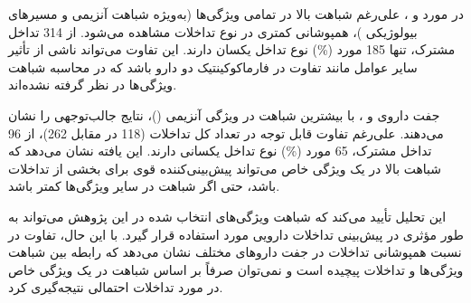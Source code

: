 در مورد  و ، علی‌رغم شباهت بالا در تمامی ویژگی‌ها (به‌ویژه شباهت آنزیمی  و مسیرهای بیولوژیکی )، همپوشانی کمتری در نوع تداخلات مشاهده می‌شود. از 314 تداخل مشترک، تنها 185 مورد (\%) نوع تداخل یکسان دارند. این تفاوت می‌تواند ناشی از تأثیر سایر عوامل مانند تفاوت در فارماکوکینتیک دو دارو باشد که در محاسبه شباهت ویژگی‌ها در نظر گرفته نشده‌اند.

جفت داروی  و ، با بیشترین شباهت در ویژگی آنزیمی ()، نتایج جالب‌توجهی را نشان می‌دهند. علی‌رغم تفاوت قابل توجه در تعداد کل تداخلات (118 در مقابل 262)، از 96 تداخل مشترک، 65 مورد (\%) نوع تداخل یکسانی دارند. این یافته نشان می‌دهد که شباهت بالا در یک ویژگی خاص می‌تواند پیش‌بینی‌کننده قوی برای بخشی از تداخلات باشد، حتی اگر شباهت در سایر ویژگی‌ها کمتر باشد.

این تحلیل تأیید می‌کند که شباهت ویژگی‌های انتخاب شده در این پژوهش می‌تواند به طور مؤثری در پیش‌بینی تداخلات دارویی مورد استفاده قرار گیرد. با این حال، تفاوت در نسبت همپوشانی تداخلات در جفت داروهای مختلف نشان می‌دهد که رابطه بین شباهت ویژگی‌ها و تداخلات پیچیده است و نمی‌توان صرفاً بر اساس شباهت در یک ویژگی خاص در مورد تداخلات احتمالی نتیجه‌گیری کرد.

